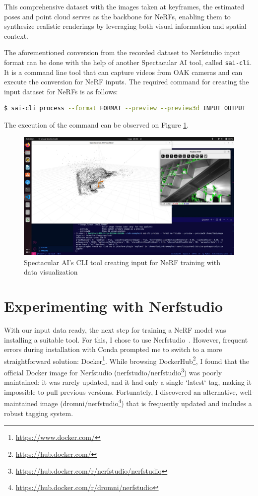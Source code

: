 This comprehensive dataset with the images taken at keyframes, the estimated poses and point cloud serves as the backbone for NeRFs, enabling them to synthesize realistic renderings by leveraging both visual information and spatial context.

The aforementioned conversion from the recorded dataset to Nerfstudio input format can be done with the help of another Spectacular AI tool, called \verb|sai-cli|. It is a command line tool that can capture videos from OAK cameras and can execute the conversion for NeRF inputs. The required command for creating the input dataset for NeRFs is as follows:

\FloatBarrier
\begin{lstlisting}[language=bash,frame=single,float=!ht]
$ sai-cli process --format FORMAT --preview --preview3d INPUT OUTPUT
\end{lstlisting}

The execution of the command can be observed on Figure \ref{fig:sai_cli_process}. 

\begin{figure}[htbp]
	\centering
	\includegraphics[width=150mm, keepaspectratio]{figures_jpg/sai-cli_process.jpg}
	\caption{Spectacular AI's CLI tool creating input for NeRF training with data visualization}
	\label{fig:sai_cli_process}
\end{figure}

\section{Experimenting with Nerfstudio}

With our input data ready, the next step for training a NeRF model was installing a suitable tool. For this, I chose to use Nerfstudio~\cite{nerfstudio}. However, frequent errors during installation with Conda prompted me to switch to a more straightforward solution: Docker\footnote{\url{https://www.docker.com/}}. While browsing DockerHub\footnote{\url{https://hub.docker.com/}}, I found that the official Docker image for Nerfstudio (nerfstudio/nerfstudio\footnote{\url{https://hub.docker.com/r/nerfstudio/nerfstudio}}) was poorly maintained: it was rarely updated, and it had only a single `latest` tag, making it impossible to pull previous versions. Fortunately, I discovered an alternative, well-maintained image (dromni/nerfstudio\footnote{\url{https://hub.docker.com/r/dromni/nerfstudio}}) that is frequently updated and includes a robust tagging system.

